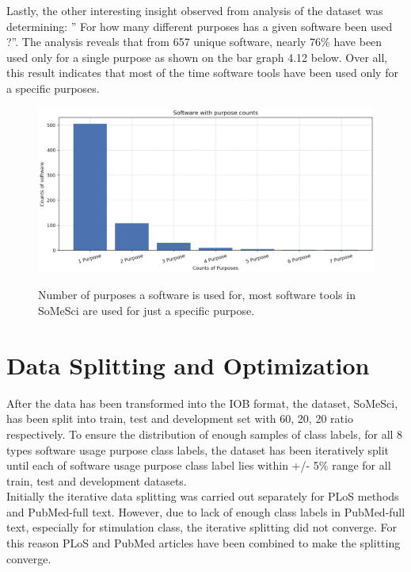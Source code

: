 Lastly, the other interesting insight observed from analysis of the dataset was determining: ” For how many different purposes has a given software been used ?”.  The analysis reveals that from 657 unique software, nearly 76\% have been used only for a single purpose as shown on the bar graph 4.12 below. Over all, this result indicates that most of the time software tools have been used only for a specific purposes.


\begin{figure}[h]
	\centering
	\includegraphics[width=.80\linewidth]{4.graphics/figures/ch_4/analysisresults/7.counts of software purpose}
	\label{fig:chapter03:subfloat:grafik1}
	\caption{Number of purposes a software is used for, most software tools in SoMeSci are used for just a specific purpose.}
\end{figure}



\section{Data Splitting and Optimization}
\label{subsec:dataset:preprocessing:Splitting}
After the data has been transformed into the IOB format, the dataset, \ac{SoMeSci}, has been split into train, test and development set with  60, 20, 20 ratio respectively. To ensure the distribution  of enough samples of class labels, for all 8 types software usage purpose class labels, the dataset has been iteratively split until each of software usage purpose class label lies within +/- 5\%  range for all train, test and development datasets. \\ 

Initially the iterative data splitting was carried out separately for PLoS methods and PubMed-full text. However, due to lack of enough class labels in PubMed-full text, especially for stimulation class, the iterative splitting did not converge. For this reason PLoS and PubMed articles have been combined to make the splitting converge. \\

